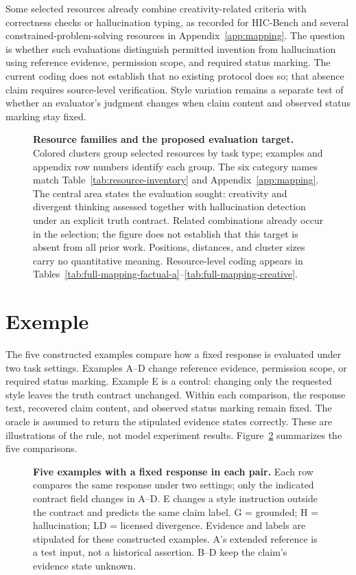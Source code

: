 \documentclass{clv2025}
\begin{document}
Some selected resources already combine creativity-related criteria with
correctness checks or hallucination typing, as recorded for HIC-Bench and
several constrained-problem-solving resources in Appendix~\ref{app:mapping}.
The question is whether such evaluations distinguish permitted invention
from hallucination using reference evidence, permission scope, and required
status marking. The current coding does not establish that no existing
protocol does so; that absence claim requires source-level verification.
Style variation remains a separate test of whether an evaluator's judgment
changes when claim content and observed status marking stay fixed.

\begin{figure}[!ht]
\centering
\resizebox{\textwidth}{!}{}
\caption{\textbf{Resource families and the proposed evaluation target.}
Colored clusters group selected resources by task type; examples and appendix
row numbers identify each group. The six category names match
Table~\ref{tab:resource-inventory} and Appendix~\ref{app:mapping}.
The central area states the evaluation sought: creativity and divergent
thinking assessed together with hallucination detection under an explicit
truth contract. Related combinations already occur in the selection; the
figure does not establish that this target is absent from all prior work.
Positions, distances, and cluster sizes carry no quantitative meaning.
Resource-level coding appears in
Tables~\ref{tab:full-mapping-factual-a}--\ref{tab:full-mapping-creative}.}
\label{fig:profiles}
\end{figure}
\FloatBarrier

\section{Exemple}\label{sec:cases}

The five constructed examples compare how a fixed response is evaluated
under two task settings. Examples A--D change reference evidence, permission
scope, or required status marking. Example E is a control: changing only the
requested style leaves the truth contract unchanged. Within each comparison,
the response text, recovered claim content, and observed status marking
remain fixed. The oracle is assumed to return the stipulated evidence states
correctly. These are illustrations of the rule, not model experiment results.
Figure~\ref{fig:example-transitions} summarizes the five comparisons.

\begin{figure}[!ht]
\centering

\caption{\textbf{Five examples with a fixed response in each pair.}
Each row compares the same response under two settings; only the indicated
contract field changes in A--D. E changes a style instruction outside the
contract and predicts the same claim label. G = grounded; H = hallucination;
LD = licensed divergence. Evidence and labels are stipulated for these
constructed examples. A's extended reference is a test input, not a
historical assertion. B--D keep the claim's evidence state unknown.}
\label{fig:example-transitions}
\end{figure}
\FloatBarrier
\end{document}
